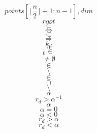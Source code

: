 \documentclass{scrreprt}
\begin{document}
\begin{equation}
points\left[\lfloor\frac{n}{2}\rfloor+1:n-1\right], dim
\end{equation}
\begin{equation}
root
\end{equation}
\begin{equation}
\subset
\end{equation}
\begin{equation}
\Leftrightarrow
\end{equation}
\begin{equation}
\subset
\end{equation}
\begin{equation}
\Rightarrow
\end{equation}
\begin{equation}
k_d
\end{equation}
\begin{equation}
_0
\end{equation}
\begin{equation}
_0 \in
\end{equation}
\begin{equation}
\neq \emptyset
\end{equation}
\begin{equation}
\in
\end{equation}
\begin{equation}
\setminus
\end{equation}
\begin{equation}
\in
\end{equation}
\begin{equation}
\cap
\end{equation}
\begin{equation}
\setminus
\end{equation}
\begin{equation}
\alpha
\end{equation}
\begin{equation}
r_d > \alpha^{-1}
\end{equation}
\begin{equation}
\alpha
\end{equation}
\begin{equation}
\alpha=0
\end{equation}
\begin{equation}
\alpha<0
\end{equation}
\begin{equation}
r_d > \alpha
\end{equation}
\begin{equation}
r_d < \alpha
\end{equation}
\end{document}
